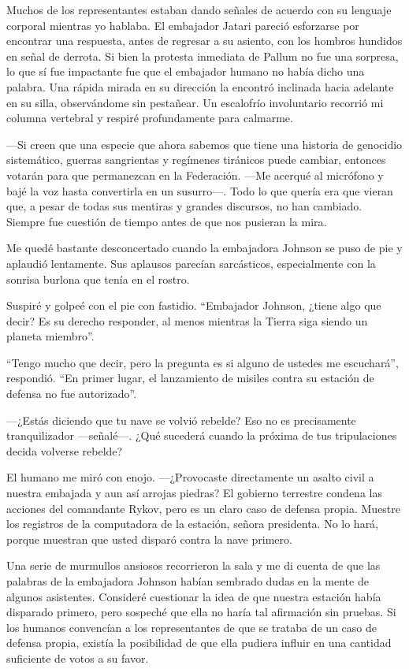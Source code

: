 Muchos de los representantes estaban dando señales de acuerdo con su lenguaje corporal mientras yo hablaba. El embajador Jatari pareció esforzarse por encontrar una respuesta, antes de regresar a su asiento, con los hombros hundidos en señal de derrota. Si bien la protesta inmediata de Pallum no fue una sorpresa, lo que sí fue impactante fue que el embajador humano no había dicho una palabra. Una rápida mirada en su dirección la encontró inclinada hacia adelante en su silla, observándome sin pestañear. Un escalofrío involuntario recorrió mi columna vertebral y respiré profundamente para calmarme.

—Si creen que una especie que ahora sabemos que tiene una historia de genocidio sistemático, guerras sangrientas y regímenes tiránicos puede cambiar, entonces votarán para que permanezcan en la Federación. —Me acerqué al micrófono y bajé la voz hasta convertirla en un susurro—. Todo lo que quería era que vieran que, a pesar de todas sus mentiras y grandes discursos, no han cambiado. Siempre fue cuestión de tiempo antes de que nos pusieran la mira.

Me quedé bastante desconcertado cuando la embajadora Johnson se puso de pie y aplaudió lentamente. Sus aplausos parecían sarcásticos, especialmente con la sonrisa burlona que tenía en el rostro.

Suspiré y golpeé con el pie con fastidio. ``Embajador Johnson, ¿tiene algo que decir? Es su derecho responder, al menos mientras la Tierra siga siendo un planeta miembro''.

``Tengo mucho que decir, pero la pregunta es si alguno de ustedes me escuchará'', respondió. ``En primer lugar, el lanzamiento de misiles contra su estación de defensa no fue autorizado''.

—¿Estás diciendo que tu nave se volvió rebelde? Eso no es precisamente tranquilizador —señalé—. ¿Qué sucederá cuando la próxima de tus tripulaciones decida volverse rebelde?

El humano me miró con enojo. —¿Provocaste directamente un asalto civil a nuestra embajada y aun así arrojas piedras? El gobierno terrestre condena las acciones del comandante Rykov, pero es un claro caso de defensa propia. Muestre los registros de la computadora de la estación, señora presidenta. No lo hará, porque muestran que usted disparó contra la nave primero.

Una serie de murmullos ansiosos recorrieron la sala y me di cuenta de que las palabras de la embajadora Johnson habían sembrado dudas en la mente de algunos asistentes. Consideré cuestionar la idea de que nuestra estación había disparado primero, pero sospeché que ella no haría tal afirmación sin pruebas. Si los humanos convencían a los representantes de que se trataba de un caso de defensa propia, existía la posibilidad de que ella pudiera influir en una cantidad suficiente de votos a su favor.

